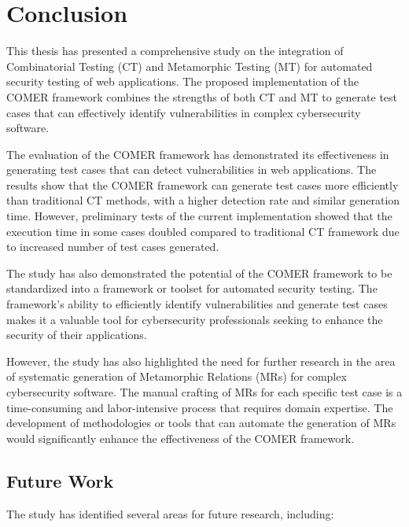 \chapter{Conclusion}
\label{ch:conclusion}

This thesis has presented a comprehensive study on the integration of Combinatorial Testing (CT) and Metamorphic Testing (MT) for automated security testing of web applications. The proposed implementation of the COMER framework combines the strengths of both CT and MT to generate test cases that can effectively identify vulnerabilities in complex cybersecurity software.

The evaluation of the COMER framework has demonstrated its effectiveness in generating test cases that can detect vulnerabilities in web applications. The results show that the COMER framework can generate test cases more efficiently than traditional CT methods, with a higher detection rate and similar generation time. However, preliminary tests of the current implementation showed that the execution time in some cases doubled compared to traditional CT framework due to increased number of test cases generated.

The study has also demonstrated the potential of the COMER framework to be standardized into a framework or toolset for automated security testing. The framework's ability to efficiently identify vulnerabilities and generate test cases makes it a valuable tool for cybersecurity professionals seeking to enhance the security of their applications.

However, the study has also highlighted the need for further research in the area of systematic generation of Metamorphic Relations (MRs) for complex cybersecurity software. The manual crafting of MRs for each specific test case is a time-consuming and labor-intensive process that requires domain expertise. The development of methodologies or tools that can automate the generation of MRs would significantly enhance the effectiveness of the COMER framework.

\section{Future Work}

The study has identified several areas for future research, including:

